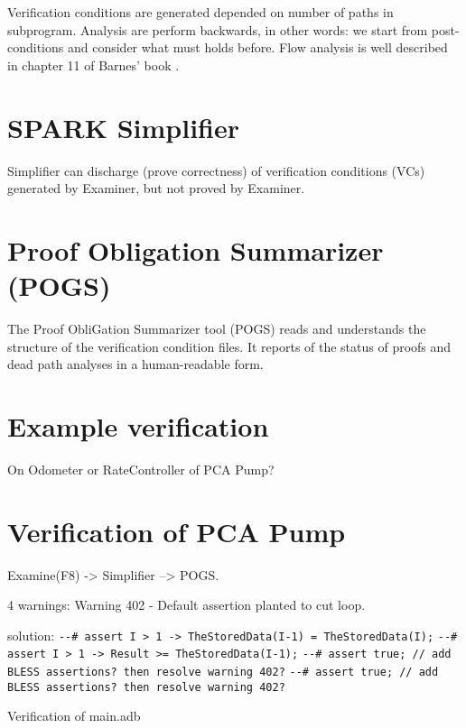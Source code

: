 Verification conditions are generated depended on number of paths in subprogram. Analysis are perform backwards, in other words: we start from post-conditions and consider what must holds before. Flow analysis is well described in chapter 11 of Barnes' book \cite{Barnes:Book}.



\section{SPARK Simplifier}
\label{verification:simplifier}

Simplifier can discharge (prove correctness) of verification conditions (VCs) generated by Examiner, but not proved by Examiner. \cite{Simplifier:Online} 


\section{Proof Obligation Summarizer (POGS)}
\label{verification:pogs}

The Proof ObliGation Summarizer tool (POGS) reads and understands the structure of the verification condition files. It reports of the status of proofs and dead path analyses in a human-readable form. \cite{POGS:Online}


\section{Example verification}
\label{verification:example}

On Odometer or RateController of PCA Pump?

\section{Verification of PCA Pump}
\label{verification:pcapump}

Examine(F8) -> Simplifier --> POGS.

4 warnings:
Warning 402 - Default assertion planted to cut loop.

solution:
\lstinline{--# assert I > 1 -> TheStoredData(I-1) = TheStoredData(I);}
\lstinline{--# assert I > 1 -> Result >= TheStoredData(I-1);}
\lstinline{--# assert true; // add BLESS assertions? then resolve warning 402?}
\lstinline{--# assert true; // add BLESS assertions? then resolve warning 402?}


Verification of main.adb

